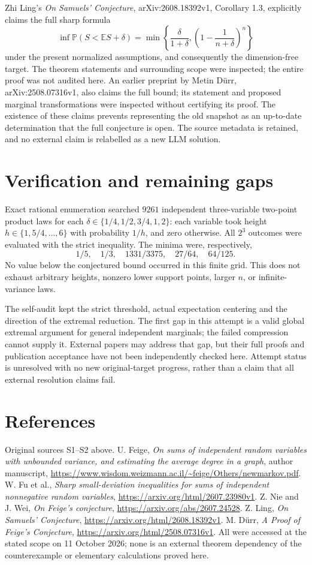 \documentclass[11pt,a4paper]{article}
\begin{document}
Zhi Ling's \emph{On Samuels' Conjecture}, arXiv:2608.18392v1, Corollary 1.3, explicitly claims the full sharp formula
\[
 \inf\mathbb P(S<\mathbb ES+\delta)=
 \min\left\{\frac\delta{1+\delta},\left(1-\frac1{n+\delta}\right)^n\right\}
\]
under the present normalized assumptions, and consequently the dimension-free target. The theorem statements and surrounding scope were inspected; the entire proof was not audited here. An earlier preprint by Metin D\"urr, arXiv:2508.07316v1, also claims the full bound; its statement and proposed marginal transformations were inspected without certifying its proof. The existence of these claims prevents representing the old snapshot as an up-to-date determination that the full conjecture is open. The source metadata is retained, and no external claim is relabelled as a new LLM solution.

\section{Verification and remaining gaps}
Exact rational enumeration searched $9261$ independent three-variable two-point product laws for each $\delta\in\{1/4,1/2,3/4,1,2\}$: each variable took height $h\in\{1,5/4,\ldots,6\}$ with probability $1/h$, and zero otherwise. All $2^3$ outcomes were evaluated with the strict inequality. The minima were, respectively,
\[
 1/5,\quad1/3,\quad1331/3375,\quad27/64,\quad64/125.
\]
No value below the conjectured bound occurred in this finite grid. This does not exhaust arbitrary heights, nonzero lower support points, larger $n$, or infinite-variance laws.

The self-audit kept the strict threshold, actual expectation centering and the direction of the extremal reduction. The first gap in this attempt is a valid global extremal argument for general independent marginals; the failed compression cannot supply it. External papers may address that gap, but their full proofs and publication acceptance have not been independently checked here. Attempt status is unresolved with no new original-target progress, rather than a claim that all external resolution claims fail.

\section{References}
Original sources S1--S2 above. U. Feige, \emph{On sums of independent random variables with unbounded variance, and estimating the average degree in a graph}, author manuscript, \url{https://www.wisdom.weizmann.ac.il/~feige/Others/newmarkov.pdf}. W. Fu et al., \emph{Sharp small-deviation inequalities for sums of independent nonnegative random variables}, \url{https://arxiv.org/html/2607.23980v1}. Z. Nie and J. Wei, \emph{On Feige's conjecture}, \url{https://arxiv.org/abs/2607.24528}. Z. Ling, \emph{On Samuels' Conjecture}, \url{https://arxiv.org/html/2608.18392v1}. M. D\"urr, \emph{A Proof of Feige's Conjecture}, \url{https://arxiv.org/html/2508.07316v1}. All were accessed at the stated scope on 11 October 2026; none is an external theorem dependency of the counterexample or elementary calculations proved here.
\end{document}
